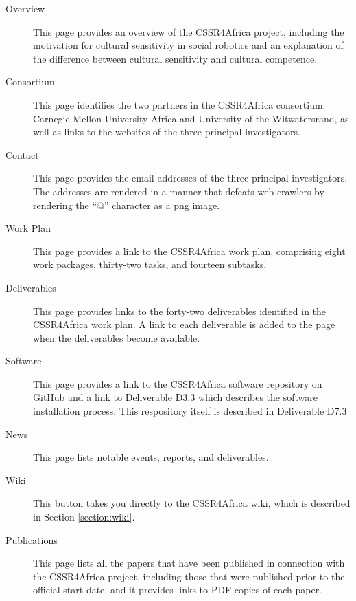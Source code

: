 \documentclass{CSSRforAfrica}
\begin{document}
\begin{description}

\item[Overview] This page provides an overview of the CSSR4Africa project, including the motivation for cultural sensitivity in social robotics and an explanation of the difference between cultural sensitivity and cultural competence.

\item[Consortium]  This page identifies the two partners in the CSSR4Africa consortium: Carnegie Mellon University Africa and  University of the Witwatersrand, as well as links to the websites of the three principal investigators.

\item[Contact]  This page provides  the email addresses of the three principal investigators. The addresses are rendered in a manner that defeats web crawlers by rendering the ``@'' character as a png image.

\item[Work Plan]  This page provides a link to the CSSR4Africa work plan, comprising eight work packages, thirty-two tasks, and fourteen subtasks.

\item[Deliverables] This page provides links to the forty-two deliverables identified in the CSSR4Africa work plan.  A link to each deliverable is added to the page when the deliverables become available.

\item[Software] This page provides a link to the CSSR4Africa software repository on GitHub and a link to Deliverable D3.3 which describes the software installation process.
This respository itself is described in Deliverable D7.3

\item[News] This page lists  notable events, reports, and deliverables.

\item[Wiki] This button takes you directly to the CSSR4Africa wiki, which is described in Section \ref{section:wiki}.

\item[Publications] This page lists all the papers that have been published in connection with the CSSR4Africa project, including those that were published prior to the official start date, and it provides links to PDF copies of each paper.

\end{description}
\end{document}

